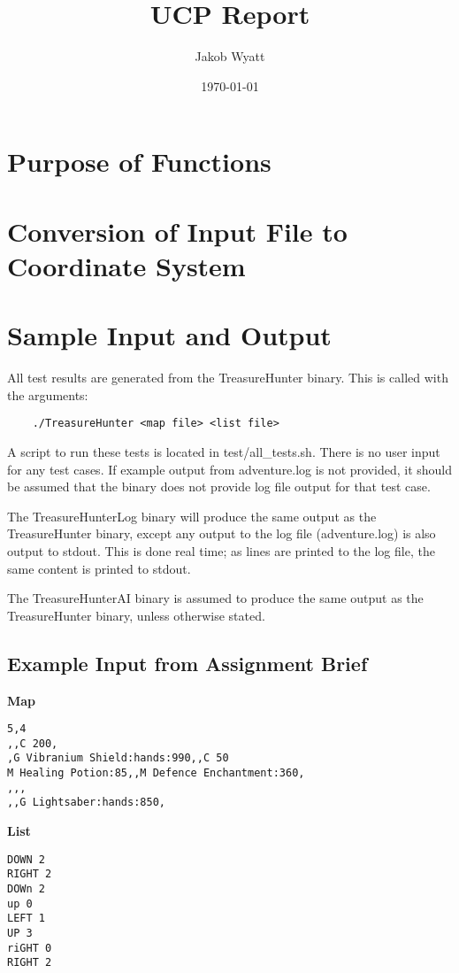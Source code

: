 \documentclass{article}
\title{UCP Report}
\date{\today}
\author{Jakob Wyatt}
\begin{document}
\maketitle
\pagebreak
\tableofcontents
\pagebreak

\section{Purpose of Functions}
\section{Conversion of Input File to Coordinate System}
\section{Sample Input and Output}
All test results are generated from the TreasureHunter binary.
This is called with the arguments:
\begin{lstlisting}
    ./TreasureHunter <map file> <list file>
\end{lstlisting}
A script to run these tests is located in test/all\_tests.sh.
There is no user input for any test cases.
If example output from adventure.log is not provided, it should be assumed that the binary
does not provide log file output for that test case.

The TreasureHunterLog binary will produce the same output as the TreasureHunter binary,
except any output to the log file (adventure.log) is also output to stdout. This is done
real time; as lines are printed to the log file, the same content is printed to stdout.

The TreasureHunterAI binary is assumed to produce the same output as the TreasureHunter binary,
unless otherwise stated.

\subsection{Example Input from Assignment Brief}
\quad \textbf{Map}
\begin{lstlisting}
5,4
,,C 200,
,G Vibranium Shield:hands:990,,C 50
M Healing Potion:85,,M Defence Enchantment:360,
,,,
,,G Lightsaber:hands:850,
\end{lstlisting}

\textbf{List}
\begin{lstlisting}
DOWN 2
RIGHT 2
DOWn 2
up 0
LEFT 1
UP 3
riGHT 0
RIGHT 2
\end{lstlisting}
\pagebreak
\end{document}
